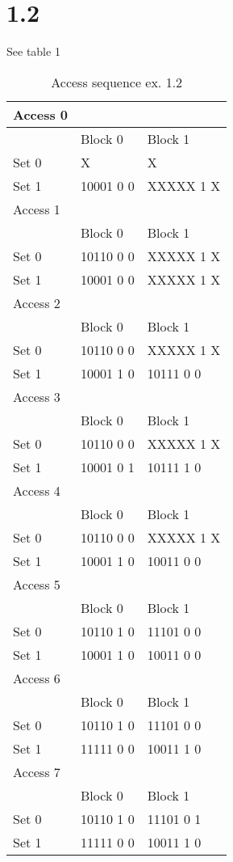 \documentclass[10pt,a4paper]{article}
\begin{document}
\section*{1.2}
See table 1
\begin{table}[h]
	\centering
	\caption{Access sequence ex. 1.2}
	\begin{tabular}{|l|l|l|}
		\hline
	Access 0	&  &  \\ \hline
		& Block 0 & Block 1  \\ \hline
	Set 0 	& X & X \\ \hline
	Set 1& 10001 0 0 & XXXXX 1 X \\ \hline
		Access 1&  &  \\ \hline
	& Block 0 & Block 1  \\ \hline
	Set 0	& 10110 0 0 & XXXXX 1 X  \\ \hline
	Set 1&  10001 0 0& XXXXX 1 X  \\ \hline
		Access 2	&  &  \\ \hline
	& Block 0 & Block 1  \\ \hline
	Set 0	& 10110 0 0& XXXXX 1 X  \\ \hline
	Set 1& 10001 1 0 & 10111 0 0  \\ \hline
		Access 3	&  &  \\ \hline
	& Block 0 & Block 1  \\ \hline
	Set 0	& 10110 0 0 & XXXXX 1 X  \\ \hline
	Set 1& 10001 0 1 & 10111 1 0  \\ \hline
		Access 4	&  &  \\ \hline
	& Block 0 & Block 1  \\ \hline
	Set 0	& 10110 0 0  & XXXXX 1 X  \\ \hline
	Set 1& 10001 1 0 & 10011 0 0  \\ \hline
	
		Access 5	&  &  \\ \hline
	& Block 0 & Block 1  \\ \hline
	Set 0	& 10110 1 0  & 11101 0 0  \\ \hline
	Set 1& 10001 1 0& 10011 0 0  \\ \hline
	
		Access 6	&  &  \\ \hline
	& Block 0 & Block 1  \\ \hline
	Set 0	& 10110 1 0  & 11101 0 0  \\ \hline
	Set 1& 11111 0 0 & 10011 1 0  \\ \hline
	
		Access 7	&  &  \\ \hline
	& Block 0 & Block 1  \\ \hline
	Set 0	& 10110 1 0  & 11101 0 1  \\ \hline
	Set 1& 11111 0 0& 10011 1 0  \\ \hline

	\end{tabular}
\end{table}
\end{document}
